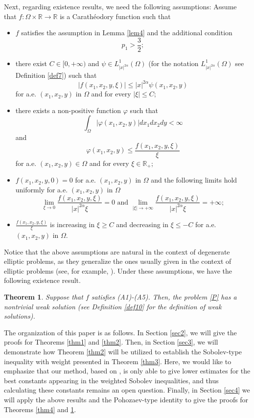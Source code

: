 \documentclass[10pt, reqno]{amsart}
\newtheorem{theorem}{Theorem}
\begin{document}
	Next, regarding existence results, we need the following assumptions: Assume that $f: \Omega \times \mathbb{R} \to \mathbb{R}$ is a Carath\'eodory function such that
	\begin{itemize}
		\item[(A1)] $f$ satisfies the assumption in Lemma \ref{lem4} and the additional condition 
		\begin{equation}\label{eqn5}
			p_1 > \dfrac{3}{2};
		\end{equation}
		\item[(A2)] there exist $C \in [0, +\infty)$ and $\psi \in L^1_{|x|^{2\alpha}} (\Omega)$ (for the notation $L^1_{|x|^{2\alpha}} (\Omega)$ see Definition \ref{def7}) such that 
		$$|f(x_1,x_2, y, \xi)| \leq |x|^{2\alpha} \psi(x_1,x_2, y)$$ 
		for a.e. $(x_1,x_2, y)$ in $\Omega$ and for every $|\xi| \leq C$;
		\item[(A3)] there exists a non-positive function $\varphi$ such that 
		$$\int_\Omega |\varphi(x_1,x_2, y)|dx_1dx_2dy < \infty$$
		and 
		$$\varphi(x_1,x_2, y) \leq \frac{ f(x_1,x_2,y,\xi)}{ \xi}$$
		for a.e. $(x_1,x_2, y) \in \Omega$ and for every $\xi \in \mathbb{R}_+$;
		\item[(A4)] $f(x_1,x_2, y, 0) = 0$ for a.e. $(x_1,x_2, y)$ in $\Omega$ and the following limits hold uniformly for a.e. $(x_1,x_2, y)$ in $\Omega$
		$$\lim\limits_{\xi\to0} \dfrac{f(x_1,x_2, y, \xi)}{ |x|^{2\alpha} \xi} = 0 \textrm{ and }\lim\limits_{ |\xi|\to+\infty} \dfrac{f(x_1,x_2, y, \xi)}{ |x|^{2\alpha}\xi}  = +\infty;$$
		\item[(A5)] $\frac{f(x_1,x_2,y,\xi )}{\xi}$ is increasing in $\xi \geq C$ and decreasing in $\xi \leq -C$ for a.e. $(x_1,x_2, y)$ in $\Omega$.
	\end{itemize}
	
	Notice that the above assumptions are natural in the context of degenerate elliptic problems, as they generalize the ones usually given in the context of elliptic problems (see, for example, \cite{Liu}). Under these assumptions, we have the following existence result.
	
	\begin{theorem}\label{thm5}
		Suppose that $f$ satisfies (A1)-(A5). Then, the problem \eqref{P} has a nontrivial weak solution (see Definition \ref{def10} for the definition of weak solutions).
	\end{theorem}
	
	The organization of this paper is as follows. In Section \ref{sec2}, we will give the proofs for Theorems \ref{thm1} and \ref{thm2}. Then, in Section \ref{sec3}, we will demonstrate how Theorem \ref{thm2} will be utilized to establish the Sobolev-type inequality with weight presented in Theorem \ref{thm3}. Here, we would like to emphasize that our method, based on \cite{nga}, is only able to give lower estimates for the best constants appearing in the weighted Sobolev inequalities, and thus calculating these constants remains an open question. Finally, in Section \ref{sec4} we will apply the above results and the Pohozaev-type identity to give the proofs for Theorems \ref{thm4} and \ref{thm5}.
	
\end{document}
